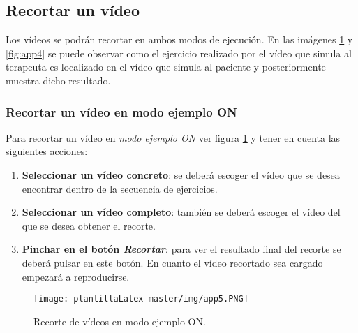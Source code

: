 \subsection{Recortar un vídeo}
Los vídeos se podrán recortar en ambos modos de ejecución. En las imágenes \ref{fig:app5} y \ref{fig:app4} se puede observar como el ejercicio realizado por el vídeo que simula al terapeuta es localizado en el vídeo que simula al paciente y posteriormente muestra dicho resultado. 

\subsubsection{Recortar un vídeo en modo ejemplo ON}
Para recortar un vídeo en \textit{modo ejemplo ON} ver figura \ref{fig:app5} y tener en cuenta las siguientes acciones:
\begin{enumerate}
    \item \textbf{Seleccionar un vídeo concreto}: se deberá escoger el vídeo que se desea encontrar dentro de la secuencia de ejercicios.
    \item \textbf{Seleccionar un vídeo completo}: también se deberá escoger el vídeo del que se desea obtener el recorte.
    \item \textbf{Pinchar en el botón \textit{Recortar}}: para ver el resultado final del recorte se deberá pulsar en este botón. En cuanto el vídeo recortado sea cargado empezará a reproducirse.
\end{enumerate}
\begin{figure}[H]
    \centering
    \texttt{[image: plantillaLatex-master/img/app5.PNG]}
    \caption{Recorte de vídeos en modo ejemplo ON.}
    \label{fig:app5}
\end{figure}

